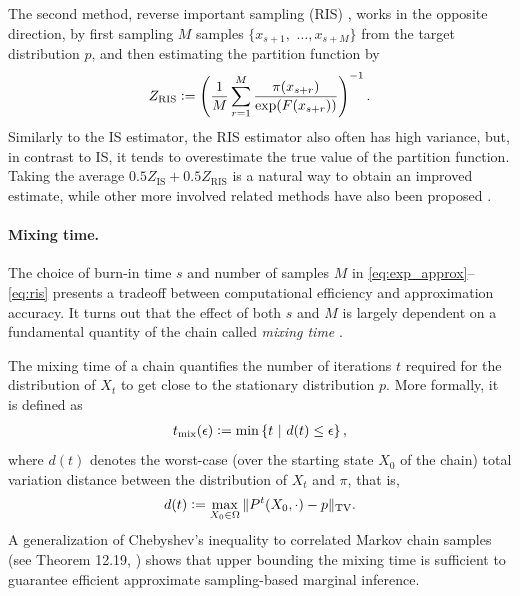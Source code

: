 The second method, reverse important sampling (RIS) \citep{ris}, works in the opposite direction, by first sampling $M$ samples $\{x_{s+1},$ $\ldots, x_{s+M}\}$ from the target distribution $p$, and then estimating the partition function by
\begin{align} \label{eq:ris}
Z_{\textrm{RIS}} \vcentcolon= \left(\frac{1}{M} \sum_{r = 1}^{M} \frac{\pi(x_{s+r})}{\exp(F(x_{s+r}))}\right)^{-1}.
\end{align}
Similarly to the IS estimator, the RIS estimator also often has high variance, but, in contrast to IS, it tends to overestimate the true value of the partition function.
Taking the average $0.5 Z_{\textrm{IS}} + 0.5 Z_{\textrm{RIS}}$ is a natural way to obtain an improved estimate, while other more involved related methods have also been proposed \citep{burda15,liu15}.

\paragraph{Mixing time.}
The choice of burn-in time $s$ and number of samples $M$ in \eqref{eq:exp_approx}--\eqref{eq:ris} presents a tradeoff between computational efficiency and approximation accuracy.
It turns out that the effect of both $s$ and $M$ is largely dependent on a fundamental quantity of the chain called \emph{mixing time} \citep{levin08book}.

The mixing time of a chain quantifies the number of iterations $t$ required for the distribution of $X_t$ to get close to the stationary distribution $p$.
More formally, it is defined as
\begin{align*}
t_{\mathrm{mix}}(\epsilon) \vcentcolon= \min \left\{t\ \middle\vert\  d(t) \leq \epsilon\right\},
\end{align*}
where $d(t)$ denotes the worst-case (over the starting state $X_0$ of the chain) total variation distance between the distribution of $X_t$ and $\pi$, that is,
\begin{align*}
d(t) \vcentcolon= \max_{X_0 \in \Omega} \| P^t(X_0, \cdot) - p \|_{\mathrm{TV}}.
\end{align*}
A generalization of Chebyshev's inequality to correlated Markov chain samples (see Theorem 12.19, \citealp{levin08book}) shows that upper bounding the mixing time is sufficient to guarantee efficient approximate sampling-based marginal inference.
